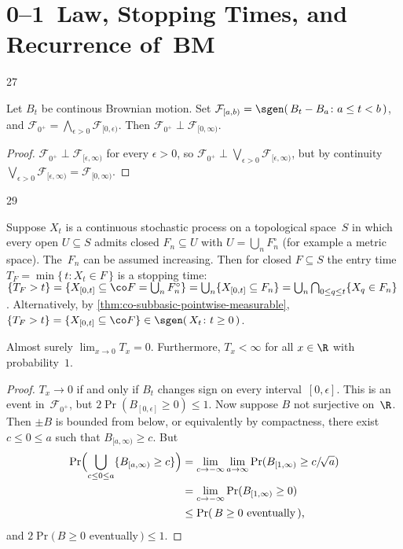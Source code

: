 \section	{0--1~Law, Stopping Times, and Recurrence of~BM}

\setcounter	{block}	{27}
\begin	{theorem}[0--1~law]
Let $B_t$ be continous Brownian motion.
Set \( \mathcal F_{[a,b)} = \sgen(\, B_t - B_a \colon a \le t < b \,) \),
and \( \mathcal F_{0^+} = \bigwedge_{\epsilon>0} \mathcal F_{[0,\epsilon)} \).
Then \( \mathcal F_{0^+} \perp \mathcal F_{[0,\infty)} \).
\end	{theorem}
\begin	{proof}
\( \mathcal F_{0^+} \perp \mathcal F_{[\epsilon,\infty)} \)
for every \( \epsilon > 0 \),
so \( \mathcal F_{0^+}
\perp \bigvee_{\epsilon>0} \mathcal F_{[\epsilon,\infty)} \),
but by continuity \( \bigvee_{\epsilon>0} \mathcal F_{[\epsilon,\infty)}
= \mathcal F_{[0,\infty)} \).
\end	{proof}

\setcounter	{block}	{29}
\begin	{remark}
Suppose $X_t$ is a continuous stochastic process
on a topological space~$S$
in which every open \( U \subseteq S \) admits closed \( F_n \subseteq U \)
with \( U = \bigcup_n F_n^\circ \)
(for example a metric space).
The~$F_n$ can be assumed increasing.
Then for closed \( F \subseteq S \)
the entry time \( T_F = \min\{\, t \colon X_t \in F \,\} \)
is a stopping time:
\(	\{ T_F > t \}
=	\{ X_{[0,t]} \subseteq \co F = \bigcup_n F_n^\circ \}
=	\bigcup_n \{ X_{[0,t]} \subseteq F_n \}
=	\bigcup_n \bigcap_{0\le q\le t} \{ X_q \in F_n \}
\).
Alternatively, by \autoref{thm:co-subbasic-pointwise-measurable},
\( \{T_F > t\} = \{X_{[0,t]} \subseteq \co F\}
\in \sgen(\, X_t \colon t \ge 0 \,) \).
\end	{remark}

\begin	{proposition}
Almost surely \( \lim_{x\to0} T_x = 0 \).
Furthermore, \( T_x < \infty \) for all \( x \in \R \)
with probability~$1$.
\end	{proposition}
\begin	{proof}
\( T_x \to 0 \) if and only if $B_t$ changes sign
on every interval~$[0,\epsilon]$.
This is an event in~$\mathcal F_{0^+}$,
but \( 2\Pr(B_{[0,\epsilon]} \ge 0) \le 1 \).
Now suppose $B$ not surjective on~$\R$.
Then \( \pm B \) is bounded from below,
or equivalently by compactness,
there exist \( c \le 0 \le a \) such that \( B_{[a,\infty)} \ge c \).
But
\begin	{align*}
	\Pr\Bigl( \bigcup_{c \le 0 \le a} \{ B_{[a,\infty)} \ge c \} \Bigr)
	&=	\lim_{c\to-\infty} \lim_{a\to\infty}
			\Pr( B_{[1,\infty)} \ge c/\!\sqrt a ) \\
	&=	\lim_{c\to-\infty}
			\Pr( B_{[1,\infty)} \ge 0 ) \\
	&\le	\Pr(\,\text{\( B \ge 0 \) eventually}\,) \text,
\end	{align*}
and \( 2\Pr(\, B \ge 0 \) eventually\(\,) \le 1 \).
\end	{proof}

